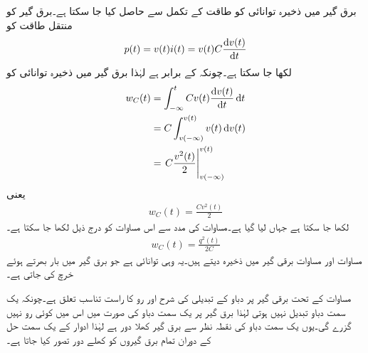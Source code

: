 برق گیر میں ذخیرہ توانائی  کو طاقت کے تکمل سے حاصل کیا جا سکتا ہے۔برق گیر کو منتقل طاقت  کو
\begin{align}\label{مساوات_امالہ_طاقت_برق_گیر}
p(t)=v(t)i(t)=v(t) C \frac{\dif v(t)}{\dif t}
\end{align}
لکھا جا سکتا ہے۔چونکہ  کے برابر ہے  لہٰذا برق گیر میں ذخیرہ توانائی کو
\begin{align*}
w_C(t)&=\int_{-\infty}^{t} C v(t) \frac{\dif v(t)}{\dif t} \dif t\\
&=C\int_{v(-\infty)}^{v(t)} v(t) \dif v(t)\\
&=\left. C \frac{v^2(t)}{2} \right|_{v(-\infty)}^{v(t)}
\end{align*}
یعنی
\begin{align}\label{مساوات_امالہ_توانائی_برق_گیر_الف}
w_C(t)=\frac{C v^2(t)}{2}
\end{align}
لکھا جا سکتا ہے جہاں  لیا گیا ہے۔مساوات  کی مدد سے اس مساوات کو درج ذیل لکھا جا سکتا ہے۔
\begin{align}\label{مسوات_امالہ_توانائی_برق_گیر_ب}
w_C(t)=\frac{q^2(t)}{2C}
\end{align}
مساوات  اور مساوات  برقی گیر میں ذخیرہ  دیتے ہیں۔یہ وہی توانائی ہے جو برق گیر میں بار بھرتے ہوئے خرچ کی جاتی ہے۔

مساوات  کے تحت برقی گیر پر دباو کے تبدیلی کی شرح اور رو کا راست تناسب تعلق ہے۔چونکہ یک سمت دباو تبدیل نہیں ہوتی لہٰذا برق گیر پر یک سمت دباو کی صورت میں اس میں کوئی رو نہیں گزرے گی۔یوں یک سمت دباو کی نقطہ نظر سے برق گیر کھلا دور ہے لہٰذا ادوار کے یک سمت حل کے دوران تمام برق گیروں کو کھلے دور تصور کیا جاتا ہے۔

